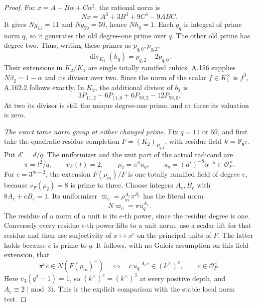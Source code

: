 \begin{proof}
For \(x=A+B\alpha+C\alpha^2\), the rational norm is
\[
                  Nx=A^3+3B^3+9C^3-9ABC.
\tag{A.162.4}
\]
It gives \(Ng_{11}=11\) and \(Ng_{59}=59\), hence \(Nh_q=1\).
Each \(g_q\) is integral of prime norm \(q\), so it generates the
old degree-one prime over \(q\).  The other old prime has degree two.
Thus, writing these primes as \(p_{q,0},p_{q,2}\),
\[
 \operatorname{div}_{K_1}(h_q)=p_{q,2}-2p_{q,0}.
\tag{A.162.5}
\]
Their extensions in \(K_2/K_1\) are single totally ramified cubics.
A.156 supplies \(N\beta_2=1-\alpha\) and its divisor over two.
Since the norm of the scalar \(f\in K_1^\times\) is \(f^3\),
A.162.2 follows exactly.  In \(K_2\), the additional divisor of \(b_2\)
is
\[
 3P_{11,2}-6P_{11,0}+6P_{59,2}-12P_{59,0}.
\tag{A.162.6}
\]
At two its divisor is still the unique degree-one prime, and at three
its valuation is zero.

\emph{The exact tame norm group at either changed prime.}
Fix \(q=11\) or \(59\), and first take the quadratic-residue
completion \(F=(K_2)_{P_{q,2}}\), with residue field \(k=\mathbb F_{q^2}\).
Put \(d'=d/q\).  The uniformizer and the unit part of the actual
radicand are
\[
 \pi=t^2/q,\qquad v_F(t)=2,\qquad
 \rho_2=\pi^8u_q,\qquad
 u_q=(d')^{-8}\alpha^{-5}\in\mathcal O_F^\times.
\tag{A.162.7}
\]
For \(e=3^{m-2}\), the extension \(F(\rho_m)/F\) is one totally
ramified field of degree \(e\), because \(v_F(\rho_2)=8\) is prime
to three.  Choose integers \(A_e,B_e\) with
\(8A_e+eB_e=1\).  Its uniformizer
\(\varpi_e=\rho_m^{A_e}\pi^{B_e}\) has the literal norm
\[
                          N\varpi_e=\pi u_q^{A_e}.
\tag{A.162.8}
\]
The residue of a norm of a unit is its \(e\)-th power, since the
residue degree is one.  Conversely every residue \(e\)-th power
lifts to a unit norm: use a scalar lift for that residue and then use
surjectivity of \(x\mapsto x^e\) on the principal units of \(F\).
The latter holds because \(e\) is prime to \(q\).
It follows, with no Galois assumption on this field extension, that
\[
 \pi^v c\in N(F(\rho_m)^\times)
 \quad\Longleftrightarrow\quad
 \overline c\,\overline u_q^{-A_ev}\in(k^\times)^e,
 \qquad c\in\mathcal O_F^\times.
\tag{A.162.9}
\]
Here \(v_3(q^2-1)=1\), so \((k^\times)^e=(k^\times)^3\) at every
positive depth, and \(A_e\equiv2\pmod3\).
This is the explicit comparison with the stable local norm test.


\end{proof}
